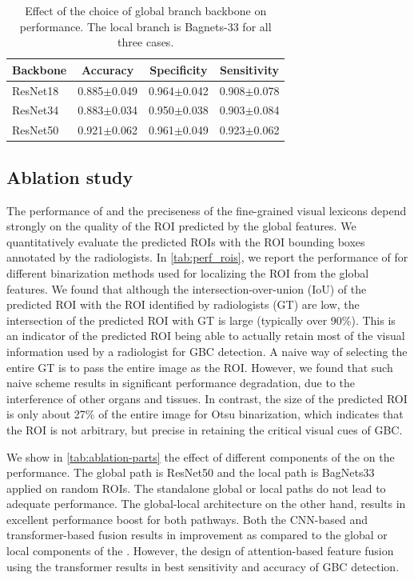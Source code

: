 \begin{table}[!ht]
   \centering
   \footnotesize
	\begin{tabular}{lccc}
		\toprule
		\textbf{Backbone} & \textbf{Accuracy} 
		&  \textbf{Specificity} & \textbf{Sensitivity}  \\
		\midrule
		ResNet18 & 0.885$\pm$0.049 & 0.964$\pm$0.042 & 0.908$\pm$0.078 \\
		ResNet34 & 0.883$\pm$0.034 & 0.950$\pm$0.038 & 0.903$\pm$0.084 \\
		ResNet50 & 0.921$\pm$0.062 & 0.961$\pm$0.049 & 0.923$\pm$0.062 \\
		\bottomrule
	\end{tabular}
	\caption[Choice of backbone in global branch]{Effect of the choice of global branch backbone on \radformer performance. The local branch is Bagnets-33 for all three cases.}
    \label{tab:ablation-backbone}
\end{table}

\subsection{Ablation study}
%
%
The performance of \radformer and the preciseness of the fine-grained visual lexicons depend strongly on the quality of the ROI predicted by the global features. We quantitatively evaluate  the predicted ROIs with the ROI bounding boxes annotated by the radiologists. In \cref{tab:perf_rois}, we report the performance of \radformer for different binarization methods used for localizing the ROI from the global features. We found that although the intersection-over-union (IoU) of the predicted ROI with the ROI identified by radiologists (GT) are low, the intersection of the predicted ROI with GT is large (typically over 90\%). This is an indicator of the predicted ROI being able to actually retain most of the visual information used by a radiologist for GBC detection. A naive way of selecting the entire GT is to pass the entire image as the ROI. However, we found that such naive scheme results in significant performance degradation, due to the interference of other organs and tissues. In contrast, the size of the predicted ROI is only about 27\% of the entire image for Otsu binarization, which indicates that the ROI is not arbitrary, but precise in retaining the critical visual cues of GBC.

%
We show in \cref{tab:ablation-parts} the effect of different components of the \radformer on the performance. The global path is ResNet50 and the local path is BagNets33 applied on random ROIs. The standalone global or local paths do not lead to adequate performance. The global-local architecture on the other hand, results in excellent performance boost for both pathways. Both the CNN-based and transformer-based fusion results in improvement as compared to the global or local components of the \radformer. However, the design of attention-based feature fusion using the transformer results in best sensitivity and accuracy of GBC detection.

